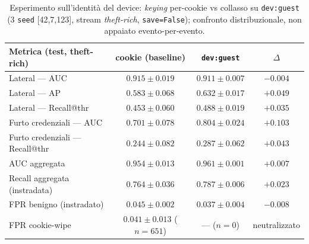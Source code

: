 \begin{table}[ht!]
\centering
\renewcommand{\arraystretch}{1.4}
\begin{tabular}{l c c c}
\hline
\textbf{Metrica (test, theft-rich)} & \textbf{cookie (baseline)} & \textbf{\texttt{dev:guest}} & $\Delta$ \\
\hline
Lateral --- AUC                  & $0.915\pm0.019$ & $0.911\pm0.007$ & $-0.004$ \\
Lateral --- AP                   & $0.583\pm0.068$ & $\mathbf{0.632}\pm0.017$ & $+0.049$ \\
Lateral --- Recall@thr           & $0.453\pm0.060$ & $\mathbf{0.488}\pm0.019$ & $+0.035$ \\
\hline
Furto credenziali --- AUC        & $0.701\pm0.078$ & $\mathbf{0.804}\pm0.024$ & $+0.103$ \\
Furto credenziali --- Recall@thr & $0.244\pm0.082$ & $\mathbf{0.287}\pm0.062$ & $+0.043$ \\
\hline
AUC aggregata                    & $0.954\pm0.013$ & $\mathbf{0.961}\pm0.001$ & $+0.007$ \\
Recall aggregata (instradata)    & $0.764\pm0.036$ & $\mathbf{0.787}\pm0.006$ & $+0.023$ \\
FPR benigno (instradato)         & $0.045\pm0.002$ & $\mathbf{0.037}\pm0.004$ & $-0.008$ \\
FPR cookie-wipe                  & $0.041\pm0.013$ ($n{=}651$) & --- ($n{=}0$) & neutralizzato \\
\hline
\end{tabular}
\caption{Esperimento sull'identità del device: \textit{keying} per-cookie vs collasso su \texttt{dev:guest} (3 \texttt{seed} [42,7,123], stream \emph{theft-rich}, \texttt{save=False}); confronto distribuzionale, non appaiato evento-per-evento.}
\label{tab:guestdev}
\end{table}

